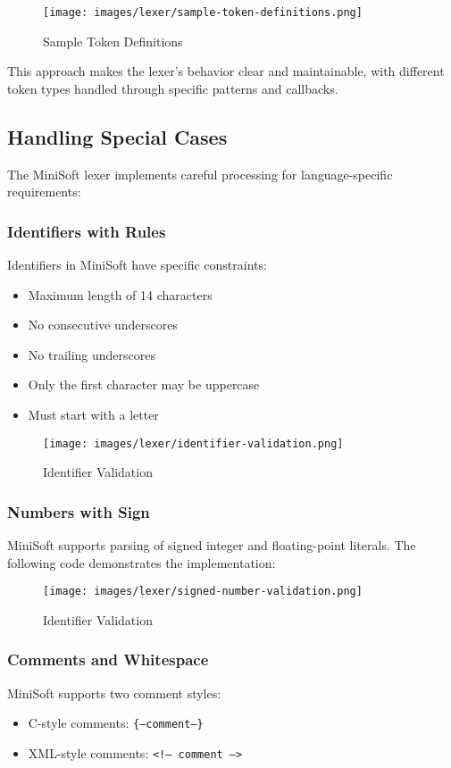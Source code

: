 \documentclass[12pt,a4paper]{article}
\begin{document}
\begin{figure}[H]
	\centering
	\texttt{[image: images/lexer/sample-token-definitions.png]}
	\caption{Sample Token Definitions}
\end{figure}

This approach makes the lexer's behavior clear and maintainable, with different token types handled through specific patterns and callbacks.

\subsection{Handling Special Cases}
The MiniSoft lexer implements careful processing for language-specific requirements:

\subsubsection{Identifiers with Rules}
Identifiers in MiniSoft have specific constraints:
\begin{itemize}
	\item Maximum length of 14 characters
	\item No consecutive underscores
	\item No trailing underscores
	\item Only the first character may be uppercase
	\item Must start with a letter
\end{itemize}


\begin{figure}[H]
	\centering
	\texttt{[image: images/lexer/identifier-validation.png]}
	\caption{Identifier Validation}
\end{figure}


\subsubsection{Numbers with Sign}
MiniSoft supports parsing of signed integer and floating-point literals. The following code demonstrates the implementation:


\begin{figure}[H]
	\centering
	\texttt{[image: images/lexer/signed-number-validation.png]}
	\caption{Identifier Validation}
\end{figure}

\subsubsection{Comments and Whitespace}
MiniSoft supports two comment styles:
\begin{itemize}
	\item C-style comments: \texttt{\{--comment--\}}
	\item XML-style comments: \texttt{<!-- comment -->}
\end{itemize}
\end{document}
